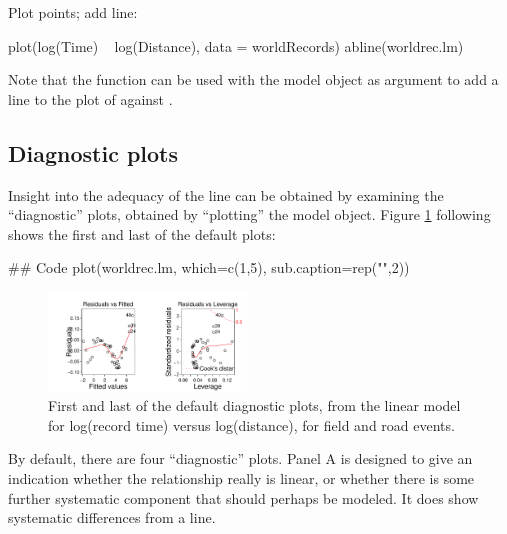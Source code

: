 \begin{marginfigure}
Plot points; add line:
\begin{Schunk}
\begin{Sinput}
plot(log(Time) ~ log(Distance),
     data = worldRecords)
abline(worldrec.lm)
\end{Sinput}
\end{Schunk}
\end{marginfigure}
Note that the function  can be used
  with the model object as argument to add a line to the plot of
   against .

\subsection*{Diagnostic plots}

Insight into the adequacy of the line can be obtained by examining the
``diagnostic'' plots, obtained by ``plotting'' the model object.
Figure \ref{fig:wr-diag} following shows the first and last of the default
plots:
\begin{Schunk}
\begin{Sinput}
## Code
plot(worldrec.lm, which=c(1,5),
     sub.caption=rep("",2))
\end{Sinput}
\end{Schunk}

\begin{figure}
\begin{Schunk}


\centerline{\includegraphics[width=0.47\textwidth]{figs/05-diag12-1} }

\end{Schunk}
      \caption{First and last of the default diagnostic plots, from the
        linear model for log(record time) versus log(distance), for
        field and road events.}
\label{fig:wr-diag}
\end{figure}

By default, there are four ``diagnostic'' plots.  Panel A is designed
to give an indication whether the relationship really is linear, or
whether there is some further systematic component that should perhaps
be modeled.  It does show systematic differences from a line.

